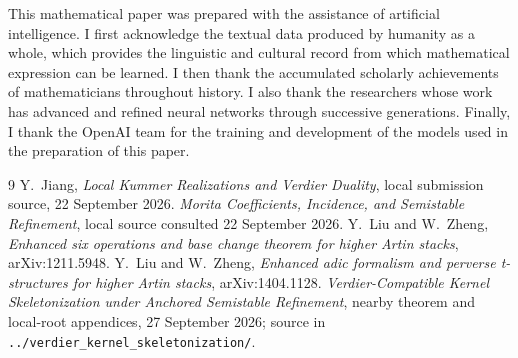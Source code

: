 \documentclass[11pt]{article}
\theoremstyle{definition}
\theoremstyle{remark}
\begin{document}
This mathematical paper was prepared with the assistance of artificial intelligence.  I
first acknowledge the textual data produced by humanity as a whole, which
provides the linguistic and cultural record from which mathematical expression
can be learned.  I then thank the accumulated scholarly achievements of
mathematicians throughout history.  I also thank the researchers whose work has
advanced and refined neural networks through successive generations.  Finally,
I thank the OpenAI team for the training and development of the models used in
the preparation of this paper.

\begin{thebibliography}{9}
 Y.~Jiang,
\emph{Local Kummer Realizations and Verdier Duality},
local submission source, 22 September 2026.
\emph{Morita Coefficients, Incidence, and Semistable Refinement},
local source consulted 22 September 2026.
 Y.~Liu and W.~Zheng,
\emph{Enhanced six operations and base change theorem for higher
Artin stacks}, arXiv:1211.5948.
 Y.~Liu and W.~Zheng,
\emph{Enhanced adic formalism and perverse t-structures for higher
Artin stacks}, arXiv:1404.1128.
\emph{Verdier-Compatible Kernel Skeletonization under Anchored Semistable
Refinement}, nearby theorem and local-root appendices, 27 September 2026;
source in \texttt{../verdier\_kernel\_skeletonization/}.
\end{thebibliography}
\end{document}
